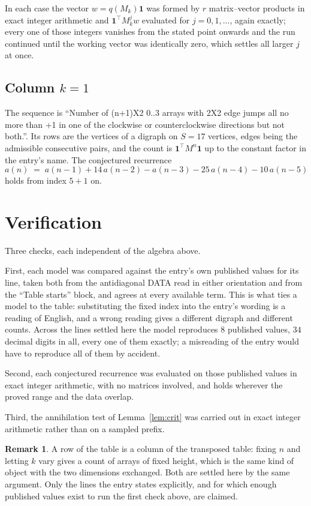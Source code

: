 \documentclass[11pt,a4paper]{article}
\theoremstyle{plain}
\theoremstyle{definition}
\newtheorem{remark}[theorem]{Remark}
\begin{document}
In each case the vector $w=q(M_k)\mathbf{1}$ was formed by $r$ matrix--vector products in
exact integer arithmetic and $\mathbf{1}^{\!\top}M_k^{j}w$ evaluated for $j=0,1,\dots$,
again exactly; every one of those integers vanishes from the stated point onwards and the run
continued until the working vector was identically zero, which settles all larger $j$ at once.

\subsection*{Column $k$$=1$}
The sequence is ``Number of (n+1)X2 0..3 arrays with 2X2 edge jumps all no more than +1 in one of the clockwise or counterclockwise directions but not both.''. Its rows are the vertices of a digraph on
$S=17$ vertices, edges being the admissible consecutive pairs, and the count is
$\mathbf{1}^{\!\top}M^{n}\mathbf{1}$ up to the constant factor in the entry's name.
The conjectured recurrence
\[
a(n)\;=\;a(n-1) + 14\,a(n-2) - a(n-3) - 25\,a(n-4) - 10\,a(n-5)
\]
holds from index $5+1$ on.

\section{Verification}

Three checks, each independent of the algebra above.

First, each model was compared against the entry's own published values for its line, taken
both from the antidiagonal DATA read in either orientation and from the ``Table starts''
block, and agrees at every available term. This is what ties a model to the table:
substituting the fixed index into the entry's wording is a reading of English, and a wrong
reading gives a different digraph and different counts. Across the lines settled here the
model reproduces $8$ published values, $34$ decimal digits in all, every one of
them exactly; a misreading of the entry would have to reproduce all of them by accident.

Second, each conjectured recurrence was evaluated on those published values in exact
integer arithmetic, with no matrices involved, and holds wherever the proved range and the
data overlap.

Third, the annihilation test of Lemma~\ref{lem:crit} was carried out in exact integer
arithmetic rather than on a sampled prefix.

\begin{remark}
A row of the table is a column of the transposed table: fixing $n$ and letting $k$ vary gives a
count of arrays of fixed height, which is the same kind of object with the two dimensions
exchanged. Both are settled here by the same argument. Only the lines the entry states
explicitly, and for which enough published values exist to run the first check above, are
claimed.
\end{remark}
\end{document}
